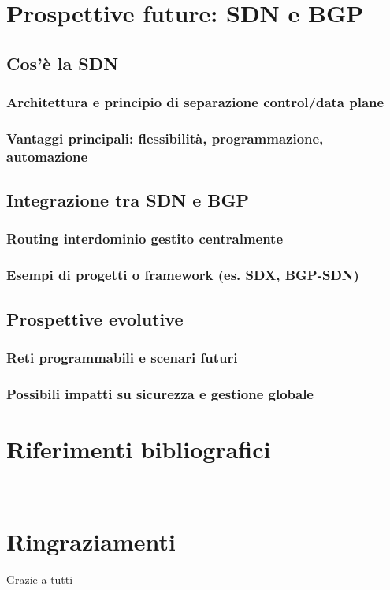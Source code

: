 \documentclass[12pt,a4paper,twoside]{book}
\begin{document}
\chapter{Prospettive future: SDN e BGP}

\section{Cos'è la SDN}
\subsection{Architettura e principio di separazione control/data plane}
\subsection{Vantaggi principali: flessibilità, programmazione, automazione}

\section{Integrazione tra SDN e BGP}
\subsection{Routing interdominio gestito centralmente}
\subsection{Esempi di progetti o framework (es. SDX, BGP-SDN)}

\section{Prospettive evolutive}
\subsection{Reti programmabili e scenari futuri}
\subsection{Possibili impatti su sicurezza e gestione globale}

\renewcommand{\bibsection}{}
\chapter*{Riferimenti bibliografici}

\newpage

\newpage~\newpage
\chapter*{Ringraziamenti}
Grazie a tutti
\end{document}

